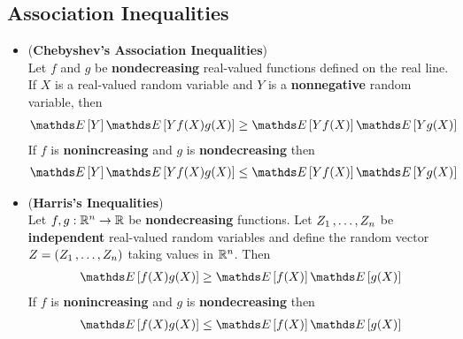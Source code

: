 \documentclass[11pt]{article}
\begin{document}
\subsection{Association Inequalities}
\begin{itemize}
\item \begin{proposition} (\textbf{Chebyshev's Association Inequalities}) \citep{boucheron2013concentration}\\
Let $f$ and $g$ be \textbf{nondecreasing} real-valued functions defined on the real line. If $X$ is a real-valued random variable and $Y$ is a \textbf{nonnegative} random variable, then
\begin{align}
\E{}{Y}\E{}{Yf(X)g(X)} \ge \E{}{Yf(X)}\E{}{Yg(X)}\label{ineqn: cheby_association_inequality_nondecreasing}
\end{align} If $f$ is \textbf{nonincreasing} and $g$ is \textbf{nondecreasing} then
\begin{align}
\E{}{Y}\E{}{Yf(X)g(X)} \le \E{}{Yf(X)}\E{}{Yg(X)}\label{ineqn: cheby_association_inequality_nonincreasing_nondecreasing}
\end{align}
\end{proposition}

\item \begin{proposition} (\textbf{Harris's Inequalities}) \citep{boucheron2013concentration}\\
Let $f, g: {\mathbb R}^n \to {\mathbb R}$ be \textbf{nondecreasing} functions. Let $Z_1 \,{,}\ldots{,}\, Z_n$ be \textbf{independent} real-valued random variables and define the random vector $Z = (Z_1 \,{,}\ldots{,}\, Z_n)$ taking values in ${\mathbb R}^n$. Then
\begin{align}
\E{}{f(X)g(X)} \ge \E{}{f(X)}\E{}{g(X)}\label{ineqn: harris_inequality_nondecreasing}
\end{align} If $f$ is \textbf{nonincreasing} and $g$ is \textbf{nondecreasing} then
\begin{align}
\E{}{f(X)g(X)} \le \E{}{f(X)}\E{}{g(X)}\label{ineqn: harris_inequality_nonincreasing_nondecreasing}
\end{align}
\end{proposition}
\end{itemize}
\end{document}
